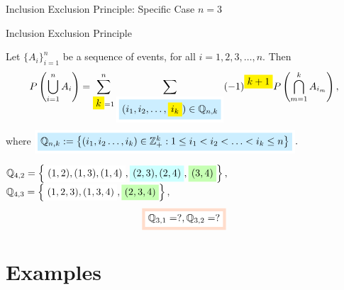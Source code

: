 \documentclass[compress]{beamer}
\begin{document}


\begin{frame}{Inclusion Exclusion Principle: Specific Case  $n=3$}


\end{frame}
\begin{frame}{Inclusion Exclusion Principle}

\begin{lemma}
Let  $\{A_i\}_{i=1}^{n}$ be a sequence of events, for all $i=1, 2, 3, \ldots, n $. Then 
$$  P\left(\bigcup_{i=1}^{n}A_i \right)= \sum_{\HLTY{k}=1}^{n } \sum_{\HLTEQ[white]{\HLTEQ[lightBlueTwo]{(i_1,i_2,\ldots,{\HLTY{i_k}})\in \mathbb{Q}_{n,k}}}} (-1)^{\HLTY{k+1}}P\left(\bigcap_{m=1}^{k} A_{i_m} \right) ,  $$
where   $ \HLTEQ[white]{\HLTEQ[lightBlueTwo]{\mathbb{Q}_{n,k}:= \left\{(i_1, i_2\ldots, i_k)\in \mathbb{Z}_{+}^k: 1\leq i_1<i_2<\ldots<i_{k}\leq n \right\} }}.$ 
\end{lemma}
$\mathbb{Q}_{4, 2}=\left\{   \HLTEQ{(1, 2), (1, 3), (1, 4)},  \HLTEQ[lightBlueOne]{(2, 3), (2, 4)},  \HLTEQ[lightGreenTwo]{(3, 4)}   \right\},$
$\mathbb{Q}_{4, 3}=\left\{   \HLTEQ{(1, 2, 3), (1, 3, 4)},  \HLTEQ[lightGreenTwo]{(2, 3, 4)}\right\},$\\
$$\HLTEQ[lightBrownOne]{ \HLTEQ[white]{  \mathbb{Q}_{3, 1}=?,\mathbb{Q}_{3, 2}=?}}$$



\end{frame}


\section{Examples}



\end{document}
